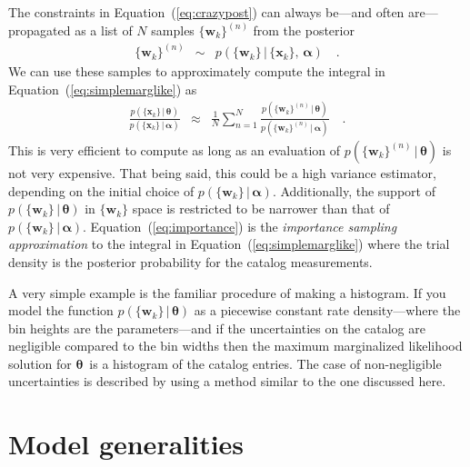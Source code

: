 \documentclass[12pt,preprint]{aastex}
\newcommand{\Eq}[1]{Equation~(\ref{eq:#1})}
\newcommand{\eq}[1]{\Eq{#1}}
\newcommand{\eqlabel}[1]{\label{eq:#1}}
\newcommand{\sectlabel}[1]{\label{sect:#1}}
\newcommand{\bvec}[1]{\ensuremath{\boldsymbol{#1}}}
\newcommand{\ratepar}{{\ensuremath{\theta}}}
\newcommand{\ratepars}{{\ensuremath{\bvec{\ratepar}}}}
\newcommand{\data}{{\ensuremath{\bvec{x}}}}
\newcommand{\entry}{{\ensuremath{\bvec{w}}}}
\newcommand{\interim}{{\ensuremath{\bvec{\alpha}}}}
\begin{document}
The constraints in \eq{crazypost} can always be---and often are---propagated
as a list of $N$ samples $\{\entry_k\}^{(n)}$ from the posterior
\begin{eqnarray}\eqlabel{samples}
\{\entry_k\}^{(n)} &\sim& p(\{\entry_k\}\,|\,\{\data_k\},\,\interim) \quad.
\end{eqnarray}
We can use these samples to approximately compute the integral in
\eq{simplemarglike} as
\begin{eqnarray}\eqlabel{importance}
\frac{p(\{\data_k\}\,|\,\ratepars)}{p(\{\data_k\}\,|\,\interim)} &\approx&
    \frac{1}{N} \sum_{n=1}^N
    \frac{p(\{\entry_k\}^{(n)}\,|\,\ratepars)}
         {p(\{\entry_k\}^{(n)}\,|\,\interim)} \quad.
\end{eqnarray}
This is very efficient to compute as long as an evaluation of
$p(\{\entry_k\}^{(n)}\,|\,\ratepars)$ is not very expensive.
That being said, this could be a high variance estimator, depending on the
initial choice of $p(\{\entry_k\}\,|\,\interim)$.
Additionally, the support of $p(\{\entry_k\}\,|\,\ratepars)$ in $\{\entry_k\}$
space is restricted to be narrower than that of
$p(\{\entry_k\}\,|\,\interim)$.
\Eq{importance} is the \emph{importance sampling approximation} to the
integral in \eq{simplemarglike} where the trial density is the posterior
probability for the catalog measurements.

A very simple example is the familiar procedure of making a histogram.
If you model the function $p(\{\entry_k\}\,|\,\ratepars)$ as a piecewise
constant rate density---where the bin heights are the parameters---and if the
uncertainties on the catalog are negligible compared to the bin widths then
the maximum marginalized likelihood solution for \ratepars\ is a histogram of
the catalog entries.
The case of non-negligible uncertainties is described by \citet{hogge} using a
method similar to the one discussed here.

\section{Model generalities}
\sectlabel{model}
\end{document}
